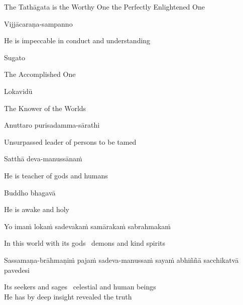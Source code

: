 \begin{english}
  The Tathāgata is the Worthy One the Perfectly Enlightened One
\end{english}

Vijjācaraṇa-sampanno

\begin{english}
  He is impeccable in conduct and understanding
\end{english}

Sugato

\begin{english}
  The Accomplished One
\end{english}

Lokavidū

\begin{english}
  The Knower of the Worlds
\end{english}

Anuttaro purisadamma-sārathi

\begin{english}
  Unsurpassed leader of persons to be tamed\ifdigitalversion\makeatletter\hyperlink{endnote3-appendix}\makeatother\fi
\end{english}

Satthā deva-manussānaṁ

\begin{english}
  He is teacher of gods and humans
\end{english}

Buddho bhagavā

\begin{english}
  He is awake and holy
\end{english}

Yo imaṁ lokaṁ sadevakaṁ samārakaṁ sabrahmakaṁ

\begin{english}
  In this world with its gods \breathmark\ demons and kind spirits
\end{english}

\begin{pali-hang}
  Sassamaṇa-brāhmaṇiṁ pajaṁ sadeva-manussaṁ sayaṁ abhiññā sacchikatvā pavedesi
\end{pali-hang}

\begin{english}
  Its seekers and sages \breathmark\ celestial and human beings\\
  He has by deep insight revealed the truth
\end{english}

